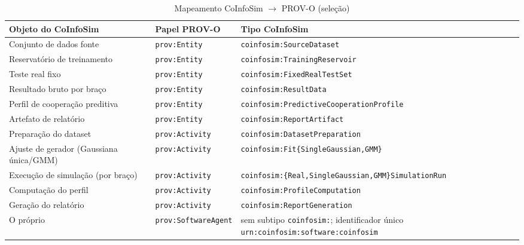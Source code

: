 \begin{table}[H]
  \centering
  \small
  \caption{Mapeamento CoInfoSim \texorpdfstring{$\to$}{->} PROV-O (seleção)}
  \label{tab:prov-roles}
  \begin{tabularx}{\textwidth}{>{\raggedright\arraybackslash}p{3.6cm}>{\raggedright\arraybackslash}p{3.3cm}X}
    \toprule
    Objeto do CoInfoSim & Papel PROV-O & Tipo CoInfoSim \\
    \midrule
    Conjunto de dados fonte & \texttt{prov:Entity} & \texttt{coinfosim:\allowbreak SourceDataset} \\
    Reservatório de treinamento & \texttt{prov:Entity} & \texttt{coinfosim:\allowbreak TrainingReservoir} \\
    Teste real fixo & \texttt{prov:Entity} & \texttt{coinfosim:\allowbreak FixedRealTestSet} \\
    Resultado bruto por braço & \texttt{prov:Entity} & \texttt{coinfosim:\allowbreak ResultData} \\
    Perfil de cooperação preditiva & \texttt{prov:Entity} & \texttt{coinfosim:\allowbreak Predictive\allowbreak CooperationProfile} \\
    Artefato de relatório & \texttt{prov:Entity} & \texttt{coinfosim:\allowbreak ReportArtifact} \\
    Preparação do dataset & \texttt{prov:Activity} & \texttt{coinfosim:\allowbreak DatasetPreparation} \\
    Ajuste de gerador (Gaussiana única/GMM) & \texttt{prov:Activity} & \texttt{coinfosim:\allowbreak Fit\{SingleGaussian,\allowbreak GMM\}} \\
    Execução de simulação (por braço) & \texttt{prov:Activity} & \texttt{coinfosim:\allowbreak\{Real,\allowbreak SingleGaussian,\allowbreak GMM\}\allowbreak SimulationRun} \\
    Computação do perfil & \texttt{prov:Activity} & \texttt{coinfosim:\allowbreak ProfileComputation} \\
    Geração do relatório & \texttt{prov:Activity} & \texttt{coinfosim:\allowbreak ReportGeneration} \\
    O próprio \CoInfoSim{} & \texttt{prov:\allowbreak SoftwareAgent} & sem subtipo \texttt{coinfosim:}; identificador único \texttt{urn:\allowbreak coinfosim:\allowbreak software:\allowbreak coinfosim} \\
    \bottomrule
  \end{tabularx}
\end{table}

